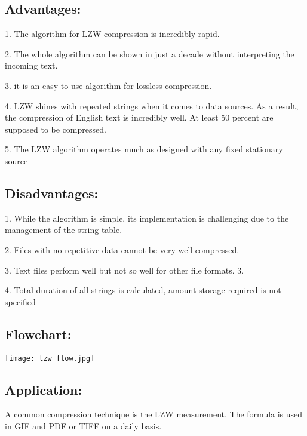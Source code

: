 \documentclass[a4paper, 12pt]{article}
\begin{document}
\subsection{ Advantages:}
\par 1. The algorithm for LZW compression is incredibly rapid.
\\
\par 2. The whole algorithm can be shown in just a decade without interpreting the 
incoming text.
\\
\par 3. it is an easy to use algorithm for lossless compression.
\\
\par 4. LZW shines with repeated strings when it comes to data sources. As a result, 
the compression of English text is incredibly well. At least 50 percent are 
supposed to be compressed.
\\
\par 5. The LZW algorithm operates much as designed with any fixed stationary 
source
\\

\subsection{ Disadvantages:}
\par 1. While the algorithm is simple, its implementation is challenging due to the management of the string table.
\\
\par 2. Files with no repetitive data cannot be very well compressed.
\\
\par 3. Text files perform well but not so well for other file formats. 3.
\\
\par 4. Total duration of all strings is calculated, amount storage required is not specified\\

\subsection{Flowchart:}
\texttt{[image: lzw flow.jpg]}
\vspace{5mm}

\subsection{Application:}
\par A common compression technique is the LZW measurement. The formula is 
used in GIF and PDF or TIFF on a daily basis.
\\
\end{document}

